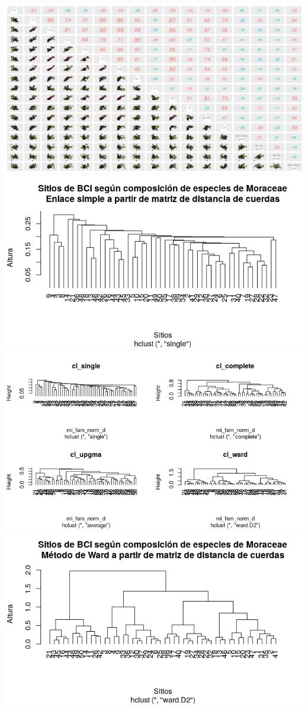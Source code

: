 \documentclass[11pt,]{article}
\begin{document}
\includegraphics[width=1.00000\textwidth]{matriz_correlacion_suelo_abun_riq_spearman.png}
\includegraphics[width=1.00000\textwidth]{sitios_composicion_distancia_cuerdas.png}
\includegraphics[width=1.00000\textwidth]{analisis_interpretacion_dendrogramas.png}
\includegraphics[width=1.00000\textwidth]{sitios_metodo_ward.png}
\end{document}
